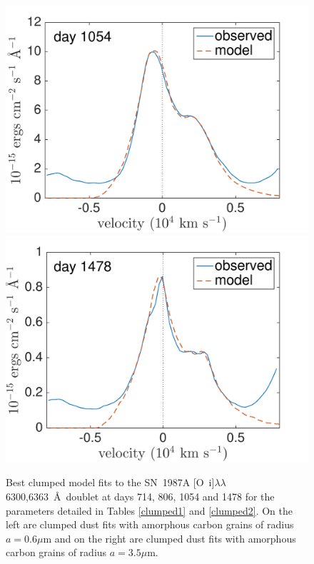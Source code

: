 \begin{figure}
\includegraphics[trim =0 0 0 0,clip=true,scale=0.37]{chapters/chapter5/images/clump_1/maximum/d1054OI.pdf}
\hspace{0mm}
\includegraphics[trim =0 0 0 0,clip=true,scale=0.37]{chapters/chapter5/images/clump_1/maximum/d1478OI_new.pdf}


\caption{Best clumped model fits to the SN~1987A [O~{\sc i}]$\lambda\lambda$6300,6363~\AA\ doublet at days 714, 806, 1054 and 1478 for the parameters detailed in Tables \ref{clumped1} and \ref{clumped2}.  On the left are clumped dust fits with amorphous carbon grains of radius $a=0.6 \mu$m and on the right are clumped dust fits with amorphous carbon grains of radius $a=3.5 \mu$m.}
\label{OI_smooth_c}

\end{figure}

